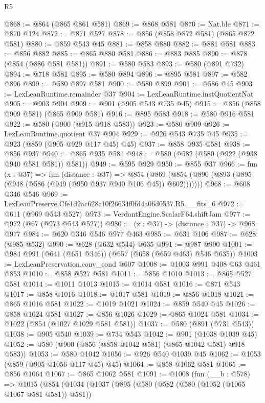 \begin{lexlean}{R5}
\begin{coremodule}
@868 := @864 (@865 @861 @581)
@869 := @868 @581
@870 := Nat.ble
@871 := @870 @124
@872 := @871 @527
@878 := @856 (@858 @872 @581) (@865 @872 @581)
@880 := @859 @543 @45
@881 := @858 @880
@882 := @881 @581
@883 := @856 @882
@885 := @865 @880 @581
@886 := @883 @885
@890 := @878 (@854 (@886 @581 @581))
@891 := @580 @583
@893 := @580 (@891 @732)
@894 := @718 @581
@895 := @580 @894
@896 := @895 @581
@897 := @582 @896
@899 := @580 @897 @581
@900 := @580 @899
@901 := @586 @45
@903 := LexLeanRuntime.remainder @37
@904 := LexLeanRuntime.instQuotientNat
@905 := @903 @904
@909 := @901 (@905 @543 @735 @45)
@915 := @856 (@858 @909 @581) (@865 @909 @581)
@916 := @895 @583
@918 := @580 @916 @581
@922 := @580 (@900 (@915 @918 @583))
@923 := @580 @909
@926 := LexLeanRuntime.quotient @37 @904
@929 := @926 @543 @735 @45
@935 := @923 (@859 (@905 @929 @117 @45) @45)
@937 := @858 @935 @581
@938 := @856 @937
@940 := @865 @935 @581
@948 := @580 (@582 (@580 (@922 (@938 @940 @581 @581)) @581))
@949 := @595 @929
@950 := @855 @37
@966 := fun (x : @37) =>
  fun (distance : @37) =>
  @854 (@869 (@854 (@890 (@893 (@895 (@948 (@586 (@949 (@950 @937 @940 @106 @45)) @602)))))))
@968 := @608 @346 @546
@969 := LexLeanPreserve.Cfe1d2ac628c10f26634f0fd4a06d0537.R5.__fits_6
@972 := @611 (@969 @543 @527)
@973 := VerdantEngine.ScalarF64.shiftJam
@977 := @972 (@67 (@973 @543 @527))
@980 := (x : @37) -> (distance : @37) -> @968 @977
@984 := @620 @346 @546 @977 @463
@985 := @631 @106
@987 := @628 (@985 @532)
@990 := @628 (@632 @544) @635
@991 := @987 @990
@1001 := @984 @991 (@641 (@651 @346)) (@657 (@658 (@659 @463) @546 @635))
@1003 := LexLeanPreservation.conv_cond @607
@1008 := @1003 @991 @408 @63 @461 @853
@1010 := @858 @527 @581
@1011 := @856 @1010
@1013 := @865 @527 @581
@1014 := @1011 @1013
@1015 := @1014 @581
@1016 := @871 @543
@1017 := @858 @1016
@1018 := @1017 @581
@1019 := @856 @1018
@1021 := @865 @1016 @581
@1022 := @1019 @1021
@1024 := @859 @540 @45
@1026 := @858 @1024 @581
@1027 := @856 @1026
@1029 := @865 @1024 @581
@1034 := @1022 (@854 (@1027 @1029 @581 @581))
@1037 := @580 (@891 (@731 @543))
@1038 := @905 @540
@1039 := @734 @543
@1042 := @901 (@1038 @1039 @45)
@1052 := @580 (@900 (@856 (@858 @1042 @581) (@865 @1042 @581) @918 @583))
@1053 := @580 @1042
@1056 := @926 @540 @1039 @45
@1062 := @1053 (@859 (@905 @1056 @117 @45) @45)
@1064 := @858 @1062 @581
@1065 := @856 @1064
@1067 := @865 @1062 @581
@1091 := @1008
    (fun (__b : @578) =>
    @1015
      (@854
        (@1034
          (@1037
            (@895
              (@580
                (@582 (@580 (@1052 (@1065 @1067 @581 @581)) @581))

\end{coremodule}
\end{lexlean}
